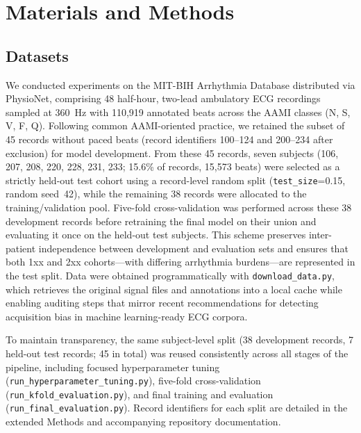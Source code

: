 \section{Materials and Methods}
\subsection{Datasets}
We conducted experiments on the MIT-BIH Arrhythmia Database distributed via PhysioNet, comprising 48 half-hour, two-lead ambulatory ECG recordings sampled at 360~Hz with 110{,}919 annotated beats across the AAMI classes (N, S, V, F, Q)\cite{goldberger2000physiobank,moody2001impact}. Following common AAMI-oriented practice, we retained the subset of 45 records without paced beats (record identifiers 100--124 and 200--234 after exclusion) for model development. From these 45 records, seven subjects (106, 207, 208, 220, 228, 231, 233; 15.6\% of records, 15{,}573 beats) were selected as a strictly held-out test cohort using a record-level random split (\texttt{test\_size}=0.15, random seed~42), while the remaining 38 records were allocated to the training/validation pool. Five-fold cross-validation was performed across these 38 development records before retraining the final model on their union and evaluating it once on the held-out test subjects. This scheme preserves inter-patient independence between development and evaluation sets and ensures that both 1xx and 2xx cohorts---with differing arrhythmia burdens---are represented in the test split. Data were obtained programmatically with \texttt{download\_data.py}, which retrieves the original signal files and annotations into a local cache while enabling auditing steps that mirror recent recommendations for detecting acquisition bias in machine learning-ready ECG corpora.

To maintain transparency, the same subject-level split (38 development records, 7 held-out test records; 45 in total) was reused consistently across all stages of the pipeline, including focused hyperparameter tuning (\texttt{run\_hyperparameter\_tuning.py}), five-fold cross-validation (\texttt{run\_kfold\_evaluation.py}), and final training and evaluation (\texttt{run\_final\_evaluation.py}). Record identifiers for each split are detailed in the extended Methods and accompanying repository documentation.

